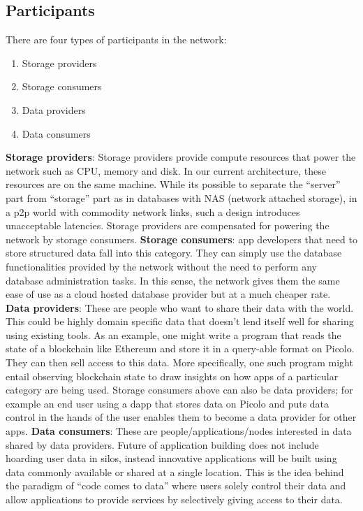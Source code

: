 \subsection{Participants} \label{sec:participants}
There are four types of participants in the network:
\begin{enumerate}
	\item Storage providers
	\item Storage consumers
	\item Data providers
	\item Data consumers \newline
\end{enumerate}
\textbf{Storage providers}: Storage providers provide compute resources that power the network such as CPU, memory and disk. In our current architecture, these resources are on the same machine. While its possible to separate the ``server'' part from ``storage'' part as in databases with NAS (network attached storage), in a p2p world with commodity network links, such a design introduces unacceptable latencies. Storage providers are compensated for powering the network by storage consumers. 
\newline\newline
\textbf{Storage consumers}: \DJ app developers that need to store structured data fall into this category. They can simply use the database functionalities provided by the network without the need to perform any database administration tasks. In this sense, the network gives them the same ease of use as a cloud hosted database provider but at a much cheaper rate.
\newline\newline
\textbf{Data providers}: These are people who want to share their data with the world. This could be highly domain specific data that doesn't lend itself well for sharing using existing tools. As an example, one might write a program that reads the state of a blockchain like Ethereum and store it in a query-able format on Picolo. They can then sell access to this data. More specifically, one such program might entail observing blockchain state to draw insights on how \DJ apps of a particular category are being used. Storage consumers above can also be data providers; for example an end user using a dapp that stores data on Picolo and puts data control in the hands of the user enables them to become a data provider for other \DJ apps. 
\newline\newline
\textbf{Data consumers}: These are people/applications/nodes interested in data shared by data providers. Future of application building does not include hoarding user data in silos, instead innovative applications will be built using data commonly available or shared at a single location. This is the idea behind the paradigm of ``code comes to data'' where users solely control their data and allow applications to provide services by selectively giving access to their data.


